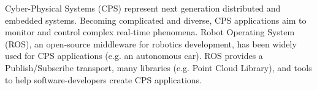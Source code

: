 \documentclass{sig-alternate-ipsn13}
\begin{document}
{%
}

\maketitle



Cyber-Physical Systems (CPS) represent next generation distributed and embedded systems. Becoming complicated and diverse, CPS applications aim to monitor and control complex real-time phenomena. Robot Operating System (ROS), an open-source middleware for robotics development, has been widely used for CPS applications (e.g. an autonomous car). ROS provides a Publish/Subscribe transport, many libraries (e.g. Point Cloud Library), and tools to help software-developers create CPS applications.
\end{document}
